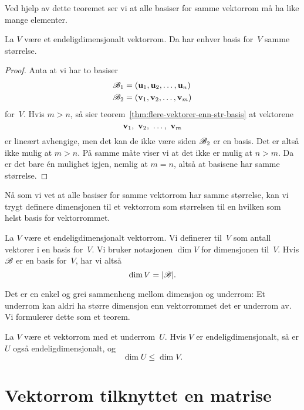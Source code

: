 Ved hjelp av dette teoremet ser vi at alle basiser for samme vektorrom
må ha like mange elementer.

\begin{thm}
\label{thm:basis-str-invariant}
La $V$ være et endeligdimensjonalt vektorrom.  Da har enhver basis
for~$V$ samme størrelse.
\end{thm}
\begin{proof}
Anta at vi har to basiser
\begin{align*}
\mathscr{B}_1 &= (\mathbf{u}_1, \mathbf{u}_2, \ldots, \mathbf{u}_n) \\
\mathscr{B}_2 &= (\mathbf{v}_1, \mathbf{v}_2, \ldots, \mathbf{v}_m)
\end{align*}
for~$V$.  Hvis $m > n$, så sier
teorem~\ref{thm:flere-vektorer-enn-str-basis} at vektorene
\[
\v_1,\ \v_2,\ \ldots,\ \v_m
\]
er lineært avhengige, men det kan de ikke være siden $\mathscr{B}_2$ er en
basis.  Det er altså ikke mulig at $m > n$.  På samme måte viser vi at
det ikke er mulig at $n > m$.  Da er det bare én mulighet igjen,
nemlig at $m = n$, altså at basisene har samme størrelse.
\end{proof}

Nå som vi vet at alle basiser for samme vektorrom har samme størrelse,
kan vi trygt definere dimensjonen til et vektorrom som størrelsen til
en hvilken som helst basis for vektorrommet.

\begin{defn}
La $V$ være et endeligdimensjonalt vektorrom.  Vi definerer
 til~$V$ som antall vektorer i en basis for~$V$.
Vi bruker notasjonen $\dim V$ for dimensjonen til~$V$.  Hvis $\mathscr{B}$ er
en basis for~$V$, har vi altså
\[
\dim V = |\mathscr{B}|.\qedhere
\]
\end{defn}


Det er en enkel og grei sammenheng mellom dimensjon og underrom: Et
underrom kan aldri ha større dimensjon enn vektorrommet det er
underrom av.  Vi formulerer dette som et teorem.

\begin{thm}
La $V$ være et vektorrom med et underrom~$U$.  Hvis $V$ er
endeligdimensjonalt, så er $U$ også endeligdimensjonalt, og
\[
\dim U \le \dim V.
\]
\end{thm}



\section*{Vektorrom tilknyttet en matrise}


